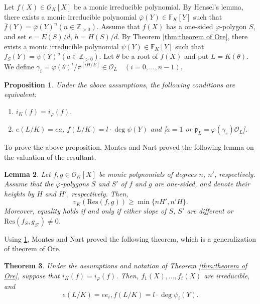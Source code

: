 \documentclass{article}
\newcommand{\field}[1]{\mathbb{#1}}
\newcommand{\Z}{\field{Z}}
\newtheorem{theorem}{Theorem}[section]
\newtheorem{lemma}[theorem]{Lemma}
\newtheorem{proposition}[theorem]{Proposition}
\theoremstyle{definition}
\theoremstyle{remark}
\numberwithin{equation}{section}
\begin{document}
    Let $f(X) \in \mathcal{O}_K[X]$ be a monic irreducible polynomial. 
    By Hensel's lemma, there exists a monic irreducible polynomial $\overline{\varphi}(Y) \in \field{F}_K[Y]$ 
    such that $\overline{f}(Y) = \overline{\varphi}(Y)^n (n \in \Z_{> 0})$. 
    Assume that $f(X)$ has a one-sided $\varphi$-polygon $S$, and set $e=E(S)/d$, $h=H(S)/d$. 
    By Theorem \ref{thm:theorem of Ore}, there exists a monic irreducible polynomial $\psi(Y) \in \field{F}_K[Y]$ 
    such that $f_S(Y) = \psi(Y)^a (a \in \Z_{> 0})$. Let $\theta$ be a root of $f(X)$ and put $L=K(\theta)$. 
    We define $\gamma_i=\varphi(\theta)^i/\pi^{[iH/E]} \in \mathcal{O}_L \quad (i = 0, \dots ,n - 1)$. 

    \begin{proposition}\label{prop:prop of Montes Nart}\cite[Proposition]{MR1152908}
      Under the above assumptions, the following conditions are equivalent: 
      \begin{enumerate}
        \item $i_K(f) = i_{\varphi}(f).$

        \item $e(L/K) = ea$, $f(L/K) = l \cdot \deg\psi(Y)$ and 
        [$a = 1$ or $\mathfrak{p}_L = \varphi(\gamma_e)\mathcal{O}_L$]. 
      \end{enumerate}
    \end{proposition}

    To prove the above proposition, Montes and Nart proved the following lemma on the valuation of the resultant. 
    
    \begin{lemma}\label{lem:valuation of resultant}\cite[Lemma 2]{MR1152908}
      Let $f,g \in \mathcal{O}_K[X]$ be monic polynomials of degrees $n$, $n'$, respectively. 
      Assume that the $\varphi$-polygons $S$ and $S'$ of $f$ and $g$ are one-sided, and denote their heights by $H$ and $H'$, respectively. 
      Then, 
      \[
        v_K(\mathrm{Res}(f,g)) \ge \min\{nH',n'H\}. 
      \]
      Moreover, equality holds if and only if either slope of $S$, $S'$ are different or $\mathrm{Res}(f_S,g_{S'}) \ne 0$. 
    \end{lemma}

     Using \cref{prop:prop of Montes Nart}, Montes and Nart proved the following theorem, which is a generalization of theorem of Ore.

    \begin{theorem}\label{thm:theorem of Montes Nart}\cite[Theorem 1]{MR1152908}
      Under the assumptions and notation of Theorem \ref{thm:theorem of Ore}, suppose that $i_K(f) = i_{\varphi}(f)$. 
      Then, $f_1(X), \dots ,f_t(X)$ are irreducible, and 
      \[
        e(L/K) = ee_i, f(L/K) = l\cdot\deg\psi_i(Y). 
      \]
    \end{theorem}
\end{document}
